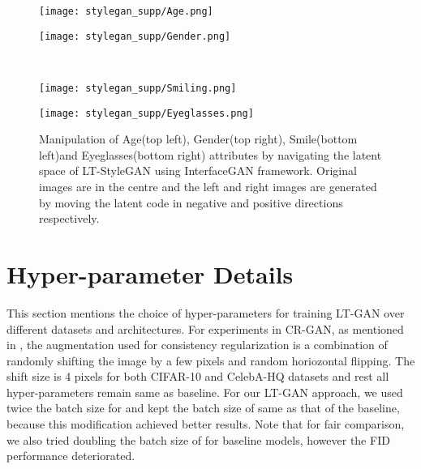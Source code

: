 \documentclass[10pt,twocolumn,letterpaper]{article}
\begin{document}
\begin{figure*}[t]
\centering
    \begin{minipage}{.48\textwidth}
    \texttt{[image: stylegan\_supp/Age.png]}
    \end{minipage}\hspace{0.05cm}
    \begin{minipage}{.48\textwidth}
    \texttt{[image: stylegan\_supp/Gender.png]}
    \end{minipage}\\
    \begin{minipage}{.48\textwidth}
    \texttt{[image: stylegan\_supp/Smiling.png]}
    \end{minipage}\hspace{0.05cm}
    \begin{minipage}{.48\textwidth}
    \texttt{[image: stylegan\_supp/Eyeglasses.png]}
    \end{minipage}
    \caption{\footnotesize{Manipulation of Age(top left), Gender(top right), Smile(bottom left)and Eyeglasses(bottom right) attributes by navigating the latent space of LT-StyleGAN using InterfaceGAN \cite{interface2020shen} framework. Original images are in the centre and the left and right images are generated by moving the latent code in negative and positive directions respectively.}}
    \label{fig:lt-stylegan2}
\end{figure*}

\section{Hyper-parameter Details}\label{sec:hyperparameter}
This section mentions the choice of hyper-parameters for training LT-GAN over different datasets and architectures.
For experiments in CR-GAN, as mentioned in \cite{crgan2019chen}, the augmentation used for consistency regularization is a combination of randomly shifting the image by a few pixels and random horiozontal flipping. The shift size is 4 pixels for both CIFAR-10 and CelebA-HQ datasets and rest all hyper-parameters remain same as baseline. For our LT-GAN approach, we used twice the batch size for  and kept the batch size of  same as that of the baseline, because this modification achieved better results.  Note that for fair comparison, we also tried doubling the batch size of  for baseline models, however the FID performance deteriorated.
\end{document}
